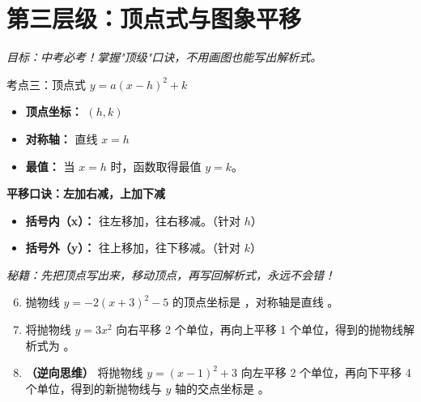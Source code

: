 \documentclass[12pt, a4paper]{article}
\begin{document}
\section{第三层级：顶点式与图象平移}
\textit{目标：中考必考！掌握"顶级"口诀，不用画图也能写出解析式。}

\begin{conceptbox}{考点三：顶点式 $y = a(x-h)^2 + k$}
    \begin{itemize}
        \item \textbf{顶点坐标：} $(h, k)$
        \item \textbf{对称轴：} 直线 $x = h$
        \item \textbf{最值：} 当 $x=h$ 时，函数取得最值 $y=k$。
    \end{itemize}
\end{conceptbox}

\begin{tipbox}
    \textbf{平移口诀：左加右减，上加下减}
    \begin{itemize}
        \item \textbf{括号内（x）：} 往左移加，往右移减。（针对 $h$）
        \item \textbf{括号外（y）：} 往上移加，往下移减。（针对 $k$）
    \end{itemize}
    \textit{秘籍：先把顶点写出来，移动顶点，再写回解析式，永远不会错！}
\end{tipbox}

\begin{examplebox}
    \begin{enumerate}[label=\textbf{例\arabic*.}]
        \setcounter{enumi}{5}
        \item 抛物线 $y = -2(x+3)^2 - 5$ 的顶点坐标是 \underline{\hspace{3cm}}，对称轴是直线 \underline{\hspace{3cm}}。
        
        \item 将抛物线 $y = 3x^2$ 向右平移 2 个单位，再向上平移 1 个单位，得到的抛物线解析式为 \underline{\hspace{4cm}}。
        
        \item \textbf{（逆向思维）} 将抛物线 $y = (x-1)^2 + 3$ 向左平移 2 个单位，再向下平移 4 个单位，得到的新抛物线与 $y$ 轴的交点坐标是 \underline{\hspace{3cm}}。
    \end{enumerate}
\end{examplebox}
\end{document}
